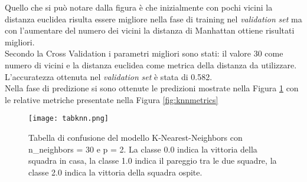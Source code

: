 Quello che si può notare dalla figura è che inizialmente con pochi vicini la distanza euclidea risulta essere migliore nella fase di training nel \emph{validation} \emph{set} ma con l'aumentare del numero dei vicini la distanza di Manhattan ottiene risultati migliori. \\
Secondo la Cross Validation i parametri migliori sono stati: il valore 30 come numero di vicini e la distanza euclidea come metrica della distanza da utilizzare. L'accuratezza ottenuta nel \emph{validation} \emph{set} è stata di 0.582.\\
Nella fase di predizione si sono ottenute le predizioni mostrate nella Figura \ref{fig:knnpre} con le relative metriche presentate nella Figura \ref{fig:knnmetrics}

\begin{figure}[h]
	\begin{center}
		\texttt{[image: tabknn.png]}
		\caption{Tabella di confusione del modello K-Nearest-Neighbors con n\_neighbors = 30 e p = 2. La classe 0.0 indica la vittoria della squadra in casa, la classe 1.0 indica il pareggio tra le due squadre, la classe 2.0 indica la vittoria della squadra ospite.
		} 
		\label{fig:knnpre}
	\end{center}
\end{figure}

